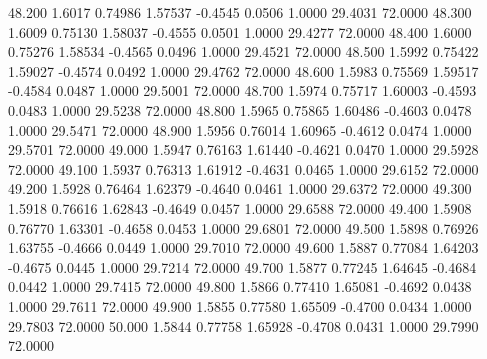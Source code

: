   48.200   1.6017   0.74986   1.57537  -0.4545   0.0506   1.0000  29.4031  72.0000
  48.300   1.6009   0.75130   1.58037  -0.4555   0.0501   1.0000  29.4277  72.0000
  48.400   1.6000   0.75276   1.58534  -0.4565   0.0496   1.0000  29.4521  72.0000
  48.500   1.5992   0.75422   1.59027  -0.4574   0.0492   1.0000  29.4762  72.0000
  48.600   1.5983   0.75569   1.59517  -0.4584   0.0487   1.0000  29.5001  72.0000
  48.700   1.5974   0.75717   1.60003  -0.4593   0.0483   1.0000  29.5238  72.0000
  48.800   1.5965   0.75865   1.60486  -0.4603   0.0478   1.0000  29.5471  72.0000
  48.900   1.5956   0.76014   1.60965  -0.4612   0.0474   1.0000  29.5701  72.0000
  49.000   1.5947   0.76163   1.61440  -0.4621   0.0470   1.0000  29.5928  72.0000
  49.100   1.5937   0.76313   1.61912  -0.4631   0.0465   1.0000  29.6152  72.0000
  49.200   1.5928   0.76464   1.62379  -0.4640   0.0461   1.0000  29.6372  72.0000
  49.300   1.5918   0.76616   1.62843  -0.4649   0.0457   1.0000  29.6588  72.0000
  49.400   1.5908   0.76770   1.63301  -0.4658   0.0453   1.0000  29.6801  72.0000
  49.500   1.5898   0.76926   1.63755  -0.4666   0.0449   1.0000  29.7010  72.0000
  49.600   1.5887   0.77084   1.64203  -0.4675   0.0445   1.0000  29.7214  72.0000
  49.700   1.5877   0.77245   1.64645  -0.4684   0.0442   1.0000  29.7415  72.0000
  49.800   1.5866   0.77410   1.65081  -0.4692   0.0438   1.0000  29.7611  72.0000
  49.900   1.5855   0.77580   1.65509  -0.4700   0.0434   1.0000  29.7803  72.0000
  50.000   1.5844   0.77758   1.65928  -0.4708   0.0431   1.0000  29.7990  72.0000
